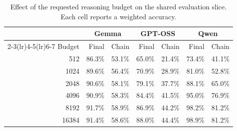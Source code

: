 \begin{table}[t]
    \centering
    \caption{Effect of the requested reasoning budget on the shared evaluation slice. Each cell reports a weighted accuracy.}
    \label{tab:budget}
    \small
    \begin{tabular}{r rr rr rr}
        \toprule
        & \multicolumn{2}{c}{Gemma} & \multicolumn{2}{c}{GPT-OSS} & \multicolumn{2}{c}{Qwen} \\
        \cmidrule(lr){2-3}\cmidrule(lr){4-5}\cmidrule(lr){6-7}
        Budget & Final & Chain & Final & Chain & Final & Chain \\
        \midrule
        512 & 86.3\% & 53.1\% & 65.0\% & 21.4\% & 73.4\% & 41.1\% \\
        1024 & 89.6\% & 56.4\% & 70.9\% & 28.9\% & 81.0\% & 52.8\% \\
        2048 & 90.6\% & 58.1\% & 79.1\% & 37.7\% & 88.1\% & 65.0\% \\
        4096 & 90.9\% & 58.3\% & 84.4\% & 41.5\% & 95.0\% & 76.9\% \\
        8192 & 91.7\% & 58.9\% & 86.9\% & 44.2\% & 98.2\% & 81.2\% \\
        16384 & 91.4\% & 58.6\% & 88.0\% & 44.4\% & 98.9\% & 81.2\% \\
        \bottomrule
    \end{tabular}
\end{table}
